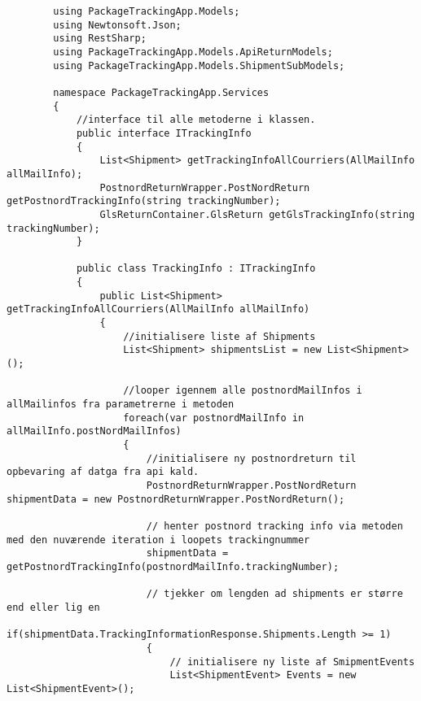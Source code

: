 \begin{verbatim}
        using PackageTrackingApp.Models;
        using Newtonsoft.Json;
        using RestSharp;
        using PackageTrackingApp.Models.ApiReturnModels;
        using PackageTrackingApp.Models.ShipmentSubModels;
        
        namespace PackageTrackingApp.Services
        {
            //interface til alle metoderne i klassen.
            public interface ITrackingInfo
            {
                List<Shipment> getTrackingInfoAllCourriers(AllMailInfo allMailInfo);
                PostnordReturnWrapper.PostNordReturn getPostnordTrackingInfo(string trackingNumber);
                GlsReturnContainer.GlsReturn getGlsTrackingInfo(string trackingNumber);
            }
        
            public class TrackingInfo : ITrackingInfo
            {
                public List<Shipment> getTrackingInfoAllCourriers(AllMailInfo allMailInfo)
                {
                    //initialisere liste af Shipments
                    List<Shipment> shipmentsList = new List<Shipment>();
        
                    //looper igennem alle postnordMailInfos i allMailinfos fra parametrerne i metoden
                    foreach(var postnordMailInfo in allMailInfo.postNordMailInfos)
                    {
                        //initialisere ny postnordreturn til opbevaring af datga fra api kald.
                        PostnordReturnWrapper.PostNordReturn shipmentData = new PostnordReturnWrapper.PostNordReturn();
        
                        // henter postnord tracking info via metoden med den nuværende iteration i loopets trackingnummer
                        shipmentData = getPostnordTrackingInfo(postnordMailInfo.trackingNumber);
        
                        // tjekker om lengden ad shipments er større end eller lig en
                        if(shipmentData.TrackingInformationResponse.Shipments.Length >= 1)
                        {
                            // initialisere ny liste af SmipmentEvents
                            List<ShipmentEvent> Events = new List<ShipmentEvent>();
        

\end{verbatim}
